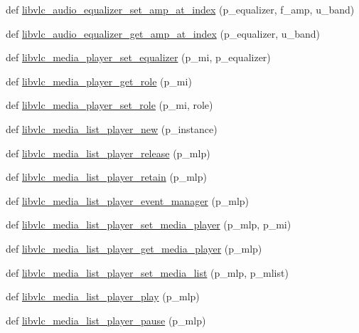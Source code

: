 \begin{DoxyCompactItemize}
\item 
def \hyperlink{namespacevlc_afa112c9fa2e01582526543f4cc824132}{libvlc\+\_\+audio\+\_\+equalizer\+\_\+set\+\_\+amp\+\_\+at\+\_\+index} (p\+\_\+equalizer, f\+\_\+amp, u\+\_\+band)
\item 
def \hyperlink{namespacevlc_ab14a271ab740aa688682202d8957f024}{libvlc\+\_\+audio\+\_\+equalizer\+\_\+get\+\_\+amp\+\_\+at\+\_\+index} (p\+\_\+equalizer, u\+\_\+band)
\item 
def \hyperlink{namespacevlc_a236caf234257aa13be369f848074238f}{libvlc\+\_\+media\+\_\+player\+\_\+set\+\_\+equalizer} (p\+\_\+mi, p\+\_\+equalizer)
\item 
def \hyperlink{namespacevlc_a14ecc9df7e469ebd985efdfd70701d1e}{libvlc\+\_\+media\+\_\+player\+\_\+get\+\_\+role} (p\+\_\+mi)
\item 
def \hyperlink{namespacevlc_a6a98b9503c22b828717b774246b1252d}{libvlc\+\_\+media\+\_\+player\+\_\+set\+\_\+role} (p\+\_\+mi, role)
\item 
def \hyperlink{namespacevlc_ab4b8362acc8c1e94658a0dd96bc5a120}{libvlc\+\_\+media\+\_\+list\+\_\+player\+\_\+new} (p\+\_\+instance)
\item 
def \hyperlink{namespacevlc_a3763e35fa1176f0fafd4fe033738e96f}{libvlc\+\_\+media\+\_\+list\+\_\+player\+\_\+release} (p\+\_\+mlp)
\item 
def \hyperlink{namespacevlc_ac79a3046c80d6a0269c84975dd996085}{libvlc\+\_\+media\+\_\+list\+\_\+player\+\_\+retain} (p\+\_\+mlp)
\item 
def \hyperlink{namespacevlc_ace48e0ef2379ca0f1fbdbefdcc251cfe}{libvlc\+\_\+media\+\_\+list\+\_\+player\+\_\+event\+\_\+manager} (p\+\_\+mlp)
\item 
def \hyperlink{namespacevlc_ae77d2d55e63161551bc26b440c28743c}{libvlc\+\_\+media\+\_\+list\+\_\+player\+\_\+set\+\_\+media\+\_\+player} (p\+\_\+mlp, p\+\_\+mi)
\item 
def \hyperlink{namespacevlc_a2da962bb3cca726aa13428060f11e7e8}{libvlc\+\_\+media\+\_\+list\+\_\+player\+\_\+get\+\_\+media\+\_\+player} (p\+\_\+mlp)
\item 
def \hyperlink{namespacevlc_ad7bd543571d19ee4ae115ec8ff31db94}{libvlc\+\_\+media\+\_\+list\+\_\+player\+\_\+set\+\_\+media\+\_\+list} (p\+\_\+mlp, p\+\_\+mlist)
\item 
def \hyperlink{namespacevlc_a613ec3b14b03b7c91c89783e633bc031}{libvlc\+\_\+media\+\_\+list\+\_\+player\+\_\+play} (p\+\_\+mlp)
\item 
def \hyperlink{namespacevlc_a789787fb851dce24255c0e24199818de}{libvlc\+\_\+media\+\_\+list\+\_\+player\+\_\+pause} (p\+\_\+mlp)

\end{DoxyCompactItemize}
